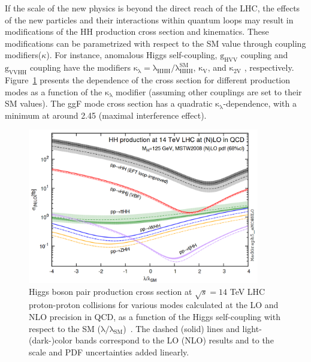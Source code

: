 If the scale of the new physics is beyond the direct reach of the LHC, the effects of the new particles and their interactions within quantum loops may result in modifications of the HH production cross section and kinematics. These modifications can be parametrized with respect to the SM value through coupling modifiers($\kappa$). For instance, anomalous Higgs self-coupling, $\mathrm{g_{HVV}}$ coupling and  $\mathrm{g_{VVHH}}$ coupling have the modifiers $\mathrm{\kappa_{\lambda}=\lambda_{HHH}/\lambda^{SM}_{HHH}}$, $\mathrm{\kappa_{V}}$, and $\mathrm{\kappa_{2V}}$ , respectively. Figure~\ref{fig:klambdaxs} presents the dependence of the cross section for different production modes as a function of the $\mathrm{\kappa_{\lambda}}$ modifier (assuming other couplings are set to their SM values). The ggF mode cross section has a quadratic $\mathrm{\kappa_{\lambda}}$-dependence, with a minimum at around 2.45 (maximal interference effect). 

\begin{figure}[ht]
\centering
\includegraphics[width=0.9\textwidth]{Figures/HiggsPairProduction/klambdaxs.png}
\caption[Higgs boson pair production cross section at $\sqrt{s}=14$ TeV LHC proton-proton collisions for various modes]{Higgs boson pair production cross section at $\sqrt{s}=14$ TeV LHC proton-proton collisions for various modes calculated at the LO and NLO precision in QCD, as a function of the Higgs self-coupling with respect to the SM ($\mathrm{\lambda/\lambda_{SM}}$)~\cite{Frederix:2014hta}. The dashed (solid) lines and light- (dark-)color bands correspond to the LO (NLO) results and to the scale and PDF uncertainties added linearly.}
\label{fig:klambdaxs}
\end{figure}

